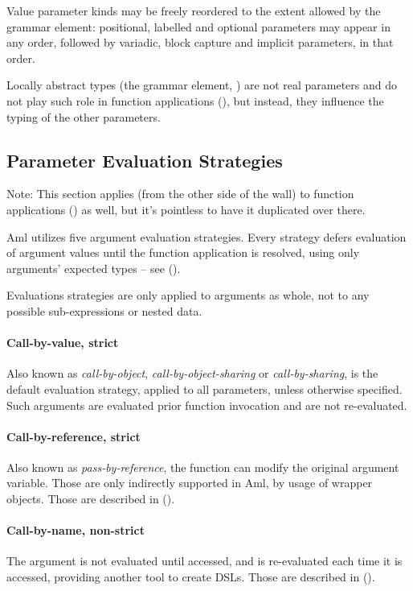 Value parameter kinds may be freely reordered to the extent allowed by the  grammar element: positional, labelled and optional parameters may appear in any order, followed by variadic, block capture and implicit parameters, in that order. 

Locally abstract types (the  grammar element, ) are not real parameters and do not play such role in function applications (), but instead, they influence the typing of the other parameters. 





\subsection{Parameter Evaluation Strategies}
\label{sec:param-eval-strategies}

Note: This section applies (from the other side of the wall) to function applications () as well, but it's pointless to have it duplicated over there. 

Aml utilizes five argument evaluation strategies. Every strategy defers evaluation of argument values until the function application is resolved, using only arguments' expected types -- see (). 

Evaluations strategies are only applied to arguments as whole, not to any possible sub-expressions or nested data. 

\paragraph{Call-by-value, strict}
Also known as {\em call-by-object}, {\em call-by-object-sharing} or {\em call-by-sharing}, is the default evaluation strategy, applied to all parameters, unless otherwise specified. Such arguments are evaluated prior function invocation and are not re-evaluated. 

\paragraph{Call-by-reference, strict}
Also known as {\em pass-by-reference}, the function can modify the original argument variable. Those are only indirectly supported in Aml, by usage of wrapper objects. Those are described in ().

\paragraph{Call-by-name, non-strict}
The argument is not evaluated until accessed, and is re-evaluated each time it is accessed, providing another tool to create DSLs. Those are described in (). 

